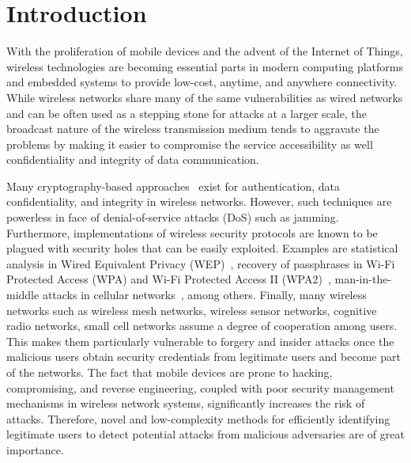 \documentclass[journal,draftcls,onecolumn,11pt]{IEEEtran}
\begin{document}
\section{Introduction} 
\label{sect:intro} 
With the proliferation of mobile devices and the advent of the Internet of Things, wireless technologies are becoming essential parts in modern computing platforms and embedded systems to provide low-cost, anytime, and anywhere connectivity. While wireless networks share many of the same vulnerabilities as wired networks and can be often used as a stepping stone for attacks at a larger scale, the broadcast nature of the wireless transmission medium tends to aggravate the problems by making it easier to compromise the service accessibility as well  confidentiality and integrity of data communication.

Many cryptography-based approaches~\cite{sklavos2003mobile} exist for authentication, data confidentiality, and integrity in wireless networks. However, such techniques are powerless in face of denial-of-service attacks (DoS) such as jamming. Furthermore, implementations of wireless security protocols are known to be plagued with security holes that can be easily exploited. Examples are statistical analysis in Wired Equivalent Privacy (WEP)~\cite{wep}, recovery of passphrases in Wi-Fi Protected Access (WPA) and Wi-Fi Protected Access II (WPA2)~\cite{mavridis2011real}, man-in-the-middle attacks in cellular networks~\cite{meyer2004man}, among others. Finally, many wireless networks such as wireless mesh networks, wireless sensor networks, cognitive radio networks, small cell networks assume a degree of cooperation among users. This makes them particularly vulnerable to forgery and insider attacks once the malicious users obtain security credentials from legitimate users and become part of the networks.  The fact that mobile devices are prone to hacking, compromising, and reverse engineering, coupled with poor security management mechanisms in wireless network systems, significantly increases the risk of attacks.  Therefore, novel and low-complexity methods for efficiently identifying legitimate users to detect potential attacks from malicious adversaries are of great importance.
\end{document}
